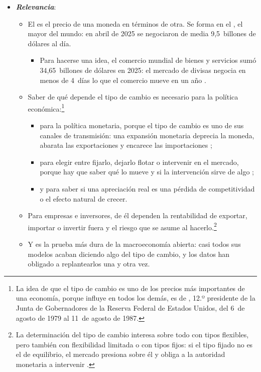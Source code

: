 \documentclass[11pt]{article}
\begin{document}
\begin{itemize}
\item \textbf{\emph{Relevancia}}:
  \begin{itemize}
  \item El  es el precio de una moneda en términos de otra. Se forma en el , el mayor del mundo: en abril de 2025 se negociaron de media 9,5~billones de dólares al día\nocite{BIS2026TrienalDatos,HuangKrohnSushko2025FX}.
    \begin{itemize}
    \item Para hacerse una idea, el comercio mundial de bienes y servicios sumó 34,65~billones de dólares en 2025\nocite{OMC2026GTOS}: el mercado de divisas negocia en menos de 4~días lo que el comercio mueve en un año .
    \end{itemize}
  \item Saber de qué depende el tipo de cambio es necesario para la política económica:\footnote{La idea de que el tipo de cambio es uno de los precios más importantes de una economía, porque influye en todos los demás, es de \nocite{VolckerGyohten1992}, 12.º presidente de la Junta de Gobernadores de la Reserva Federal de Estados Unidos, del 6~de agosto de 1979 al 11~de agosto de 1987\nocite{FedHistory2026Volcker}.}
    \begin{itemize}
    \item para la política monetaria, porque el tipo de cambio es uno de sus canales de transmisión: una expansión monetaria deprecia la moneda, abarata las exportaciones y encarece las importaciones ;
    \item para elegir entre fijarlo, dejarlo flotar o intervenir en el mercado, porque hay que saber qué lo mueve y si la intervención sirve de algo ;
    \item y para saber si una apreciación real es una pérdida de competitividad o el efecto natural de crecer.
    \end{itemize}
  \item Para empresas e inversores, de él dependen la rentabilidad de exportar, importar o invertir fuera y el riesgo que se asume al hacerlo.\footnote{La determinación del tipo de cambio interesa sobre todo con tipos flexibles, pero también con flexibilidad limitada o con tipos fijos: si el tipo fijado no es el de equilibrio, el mercado presiona sobre él y obliga a la autoridad monetaria a intervenir .}
  \item Y es la prueba más dura de la macroeconomía abierta: casi todos sus modelos acaban diciendo algo del tipo de cambio, y los datos han obligado a replantearlos una y otra vez.
  \end{itemize}


\end{itemize}
\end{document}
